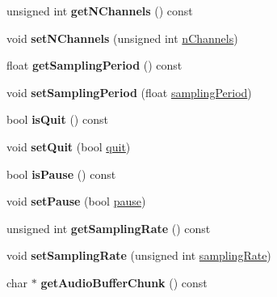 \begin{DoxyCompactItemize}
unsigned int {\bfseries get\+N\+Channels} () const
\item 
\hypertarget{classAudioInput_a3f4482ac752d8028e433e9543a53a83a}{}\label{classAudioInput_a3f4482ac752d8028e433e9543a53a83a} 
void {\bfseries set\+N\+Channels} (unsigned int \hyperlink{classAudioInput_a364801e7fa59b6c8ed881262b2085d42}{n\+Channels})
\item 
\hypertarget{classAudioInput_a261c017ca0b89a14ff0e0119bea6d8bd}{}\label{classAudioInput_a261c017ca0b89a14ff0e0119bea6d8bd} 
float {\bfseries get\+Sampling\+Period} () const
\item 
\hypertarget{classAudioInput_afbac34c42a21c102cb0c9f8db9083da5}{}\label{classAudioInput_afbac34c42a21c102cb0c9f8db9083da5} 
void {\bfseries set\+Sampling\+Period} (float \hyperlink{classAudioInput_a8b6ea4cd6b88e5cd9d051b298efbb65e}{sampling\+Period})
\item 
\hypertarget{classAudioInput_afeef426fc67f34a73132955f72068266}{}\label{classAudioInput_afeef426fc67f34a73132955f72068266} 
bool {\bfseries is\+Quit} () const
\item 
\hypertarget{classAudioInput_af5c79f83c5e014bdf12d3ad623e65be5}{}\label{classAudioInput_af5c79f83c5e014bdf12d3ad623e65be5} 
void {\bfseries set\+Quit} (bool \hyperlink{classAudioInput_aceef1c12e4f78624ed695371adf495df}{quit})
\item 
\hypertarget{classAudioInput_a59df92ca184977f5a400fe6d5cea33fc}{}\label{classAudioInput_a59df92ca184977f5a400fe6d5cea33fc} 
bool {\bfseries is\+Pause} () const
\item 
\hypertarget{classAudioInput_abc3f83d5ce04a9628bcf658cc857d786}{}\label{classAudioInput_abc3f83d5ce04a9628bcf658cc857d786} 
void {\bfseries set\+Pause} (bool \hyperlink{classAudioInput_a3ff41f73529f77872f6ab585d7cf706a}{pause})
\item 
\hypertarget{classAudioInput_a19c4e0c35b8360b0dca9cf5cad3d2e64}{}\label{classAudioInput_a19c4e0c35b8360b0dca9cf5cad3d2e64} 
unsigned int {\bfseries get\+Sampling\+Rate} () const
\item 
\hypertarget{classAudioInput_a621a6d87ca463668289f2cb7fa97c75c}{}\label{classAudioInput_a621a6d87ca463668289f2cb7fa97c75c} 
void {\bfseries set\+Sampling\+Rate} (unsigned int \hyperlink{classAudioInput_acfe371c4f5790bd67d282bc83225728e}{sampling\+Rate})
\item 
\hypertarget{classAudioInput_a31cf622d7ce0ccb7094ab42579baada1}{}\label{classAudioInput_a31cf622d7ce0ccb7094ab42579baada1} 
char $\ast$ {\bfseries get\+Audio\+Buffer\+Chunk} () const
\item 

\end{DoxyCompactItemize}

